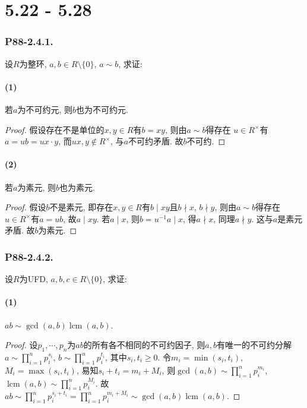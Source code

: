 \documentclass[12pt, a4paper, fontset=windows]{ctexart}
\newcommand{\lcm}{\operatorname{lcm}}
\newcommand{\unit}[1]{{#1}^\times}
\begin{document}
\clearpage
\part{5.22 - 5.28}

\section*{P88-2.4.1.}

设$R$为整环, $a,b\in R\setminus\{0\}$, $a\sim b$, 求证: 

\subsection*{(1)}

若$a$为不可约元, 则$b$也为不可约元. 

\begin{proof}
假设存在不是单位的$x,y\in R$有$b=xy$, 则由$a\sim b$得存在
$u\in\unit{R}$有$a=ub=ux\cdot y$, 而$ux,y\notin\unit{R}$, 
与$a$不可约矛盾. 故$b$不可约. 
\end{proof}

\subsection*{(2)}

若$a$为素元, 则$b$也为素元. 

\begin{proof}
假设$b$不是素元, 即存在$x,y\in R$有$b\mid xy$且$b\nmid x$, 
$b\nmid y$, 则由$a\sim b$得存在$u\in\unit{R}$有$a=ub$, 
故$a\mid xy$. 若$a\mid x$, 则$b=u^{-1}a\mid x$, 
得$a\nmid x$, 同理$a\nmid y$. 这与$a$是素元矛盾. 故$b$为素元. 
\end{proof}

\section*{P88-2.4.2.}

设$R$为UFD, $a,b,c\in R\setminus\{0\}$, 求证: 

\subsection*{(1)}

$ab\sim\gcd(a,b)\lcm(a,b)$. 

\begin{proof}
设$p_1,\cdots,p_n$为$ab$的所有各不相同的不可约因子, 
则$a,b$有唯一的不可约分解$a\sim\prod^n_{i=1}p_i^{s_i}$, 
$b\sim\prod^n_{i=1}p_i^{t_i}$, 其中$s_i,t_i\ge 0$. 
令$m_i=\min(s_i,t_i)$, $M_i=\max(s_i,t_i)$, 
易知$s_i+t_i=m_i+M_i$, 则$\gcd(a,b)\sim\prod^n_{i=1}p_i^{m_i}$, 
$\lcm(a,b)\sim\prod^n_{i=1}p_i^{M_i}$. 
故$ab\sim\prod^n_{i=1}p_i^{s_i+t_i}=\prod^n_{i=1}p_i^{m_i+M_i}\sim\gcd(a,b)\lcm(a,b)$. 
\end{proof}
\end{document}
